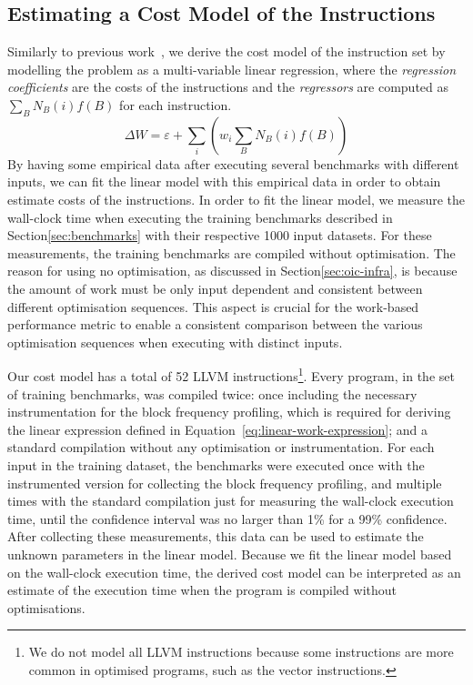 \documentclass[sigplan,10pt]{acmart}
\theoremstyle{definition}
\begin{document}
\subsection{Estimating a Cost Model of the Instructions}

Similarly to previous work~\citep{giusto01,powell09,brandolese11}, we derive the cost model of the instruction set by modelling the problem as a multi-variable linear regression, where the \textit{regression coefficients} are the costs of the instructions and the \textit{regressors} are computed as $\sum_B N_B(i)f(B)$ for each instruction.
\begin{equation}\label{eq:linear-work-expression}
\Delta W = \varepsilon + \sum_{i} \left(w_i \sum_{B} N_B(i)f(B)\right)
\end{equation}
By having some empirical data after executing several benchmarks with different inputs, we can fit the linear model with this empirical data in order to obtain estimate costs of the instructions.
In order to fit the linear model, we measure the wall-clock time when executing the training benchmarks described in Section\ref{sec:benchmarks} with their respective 1000 input datasets.
For these measurements, the training benchmarks are compiled without optimisation.
The reason for using no optimisation, as discussed in Section\ref{sec:oic-infra}, is because the amount of work must be only input dependent and consistent between different optimisation sequences.
This aspect is crucial for the work-based performance metric to enable a consistent comparison between the various optimisation sequences when executing with distinct inputs.

Our cost model has a total of 52 LLVM instructions\footnote{We do not model all LLVM instructions because some instructions are more common in optimised programs, such as the vector instructions.}.
Every program, in the set of training benchmarks, was compiled twice: once including the necessary instrumentation for the block frequency profiling, which is required for deriving the linear expression defined in Equation~\ref{eq:linear-work-expression};
and a standard compilation without any optimisation or instrumentation.
For each input in the training dataset, the benchmarks were executed once with the instrumented version for collecting the block frequency profiling, and multiple times with the standard compilation just for measuring the wall-clock execution time, until the confidence interval was no larger than 1\% for a 99\% confidence.
After collecting these measurements, this data can be used to estimate the unknown parameters in the linear model.
Because we fit the linear model based on the wall-clock execution time, the derived cost model can be interpreted as an estimate of the execution time when the program is compiled without optimisations.
\end{document}
